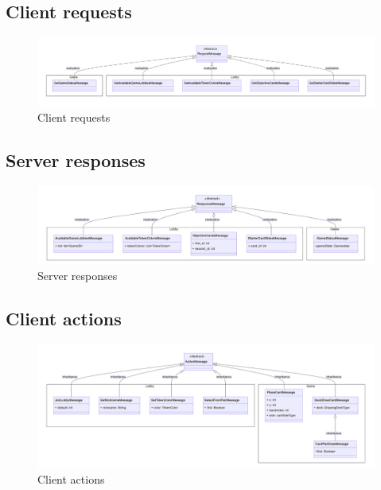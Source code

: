 \documentclass[12pt]{article}
\begin{document}
\subsection{Client requests}
\begin{figure}[H]
    \begin{center}
        \includegraphics[scale=0.2]{class_diagram_message_client_requests.png}
        \caption{Client requests}
    \end{center}
\end{figure}

\subsection{Server responses}
\begin{figure}[H]
    \begin{center}
        \includegraphics[scale=0.2]{class_diagram_message_server_responses.png}
        \caption{Server responses}
    \end{center}
\end{figure}

\subsection{Client actions}
\begin{figure}[H]
    \begin{center}
        \includegraphics[scale=0.2]{class_diagram_message_client_actions.png}
        \caption{Client actions}
    \end{center}
\end{figure}
\end{document}
